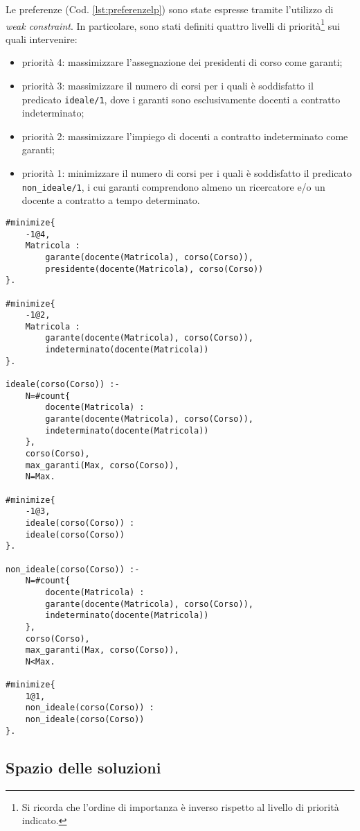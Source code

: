 Le preferenze (Cod. \ref{lst:preferenzelp}) sono state espresse tramite l'utilizzo di \textit{weak constraint}. In particolare, sono stati definiti quattro livelli di priorità\footnote{Si ricorda che l'ordine di importanza è inverso rispetto al livello di priorità indicato.} sui quali intervenire:
\begin{itemize}
    \item priorità 4: massimizzare l'assegnazione dei presidenti di corso come garanti;
    \item priorità 3: massimizzare il numero di corsi per i quali è soddisfatto il predicato \texttt{ideale/1}, dove i garanti sono esclusivamente docenti a contratto indeterminato;
    \item priorità 2: massimizzare l'impiego di docenti a contratto indeterminato come garanti;
    \item priorità 1: minimizzare il numero di corsi per i quali è soddisfatto il predicato \texttt{non\_ideale/1}, i cui garanti comprendono almeno un ricercatore e/o un docente a contratto a tempo determinato.
\end{itemize}

\begin{lstlisting}[style=asp, caption={Codice ASP del file \texttt{preferenze.lp}.}, label={lst:preferenzelp}]
#minimize{
	-1@4,
	Matricola :
		garante(docente(Matricola), corso(Corso)),
		presidente(docente(Matricola), corso(Corso))
}.

#minimize{
	-1@2,
	Matricola :
		garante(docente(Matricola), corso(Corso)),
		indeterminato(docente(Matricola))
}.

ideale(corso(Corso)) :-
	N=#count{
		docente(Matricola) :
		garante(docente(Matricola), corso(Corso)),
		indeterminato(docente(Matricola))
	},
	corso(Corso),
	max_garanti(Max, corso(Corso)),
	N=Max.

#minimize{
	-1@3,
	ideale(corso(Corso)) :
	ideale(corso(Corso))
}.

non_ideale(corso(Corso)) :-
	N=#count{
		docente(Matricola) :
		garante(docente(Matricola), corso(Corso)),
		indeterminato(docente(Matricola))
	},
	corso(Corso),
	max_garanti(Max, corso(Corso)),
	N<Max.

#minimize{
	1@1,
	non_ideale(corso(Corso)) :
	non_ideale(corso(Corso))
}.
\end{lstlisting}


\subsection{Spazio delle soluzioni}

